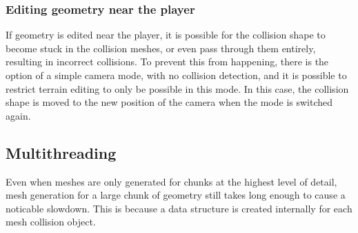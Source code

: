 \documentclass[11pt]{article}
\begin{document}
\subsubsection{Editing geometry near the player}
If geometry is edited near the player, it is possible for the collision shape to become stuck in the collision meshes, or even pass through them entirely, resulting in incorrect collisions. To prevent this from happening, there is the option of a simple camera mode, with no collision detection, and it is possible to restrict terrain editing to only be possible in this mode. In this case, the collision shape is moved to the new position of the camera when the mode is switched again.
\subsection{Multithreading}
\label{section:multithreading}
Even when meshes are only generated for chunks at the highest level of detail, mesh generation for a large chunk of geometry still takes long enough to cause a noticable slowdown. This is because a data structure is created internally for each mesh collision object.
\end{document}
